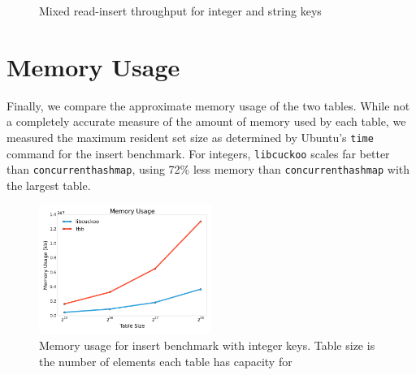 \documentclass{article}
\newcommand{\tbbmap}{\texttt{concurrent\textunderscore hash\textunderscore map}}
\newcommand{\libcuckoo}{\texttt{libcuckoo}}
\begin{document}
\begin{figure}[!htbp]
  \centering
  \caption{Mixed read-insert throughput for integer and string keys}
  \label{fig:mixed-read-insert}
\end{figure}

\section*{Memory Usage}
Finally, we compare the approximate memory usage of the two tables. While not a
completely accurate measure of the amount of memory used by each table, we
measured the maximum resident set size as determined by Ubuntu's \texttt{time}
command for the insert benchmark. For integers, {\libcuckoo} scales far better
than {\tbbmap}, using 72\% less memory than {\tbbmap} with the largest table.

\begin{figure}[!htbp]
  \centering
  \includegraphics[width=0.5\textwidth]{mem}
  \caption{Memory usage for insert benchmark with integer keys. Table size is
    the number of elements each table has capacity for}
  \label{fig:mem}
\end{figure}
\end{document}
